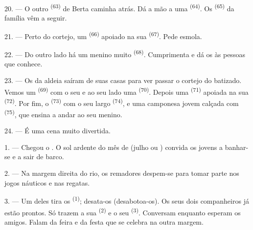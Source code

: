 20. --- O outro  \textsuperscript{(63)} de Berta caminha atrás. Dá a
mão a uma  \textsuperscript{(64)}. Os 
\textsuperscript{(65)} da família vêm a seguir.

\VUsaut{4.6mm}
\VUsaut{3.4mm}

21. --- Perto do cortejo, um  \textsuperscript{(66)} apoiado
na sua  \textsuperscript{(67)}. Pede esmola.

22. --- Do outro lado há um menino muito  \textsuperscript{(68)}.
Cumprimenta e dá os  às pessoas que conhece.

23. --- Os da aldeia saíram de suas casas para ver passar o cortejo do
batizado. Vemos um  \textsuperscript{(69)} com o seu
 e ao seu lado uma 
\textsuperscript{(70)}. Depois uma  \textsuperscript{(71)} apoiada na sua
 \textsuperscript{(72)}. Por fim, o 
\textsuperscript{(73)} com o seu largo 
\textsuperscript{(74)}, e uma camponesa jovem calçada com 
\textsuperscript{(75)}, que ensina a andar ao seu menino.

24. --- É uma cena muito divertida.
\VUsaut{4.0mm}

\VUsaut{3.0mm}

\VUsaut{2.4mm}

\VUsaut{3.0mm}

1. --- Chegou o . O sol ardente do mês de 
(julho ou ) convida os jovens a banhar-se e a sair de
barco.

2. --- Na margem direita do rio, os remadores despem-se para tomar parte
nos jogos náuticos e nas regatas.

3. --- Um deles tira os  \textsuperscript{(1)}; desata-os
(desabotoa-os). Os seus dois companheiros já estão prontos. Só trazem a
sua  \textsuperscript{(2)} e o seu 
\textsuperscript{(3)}. Conversam enquanto esperam os amigos. Falam da feira e
da festa que se celebra na outra margem.

